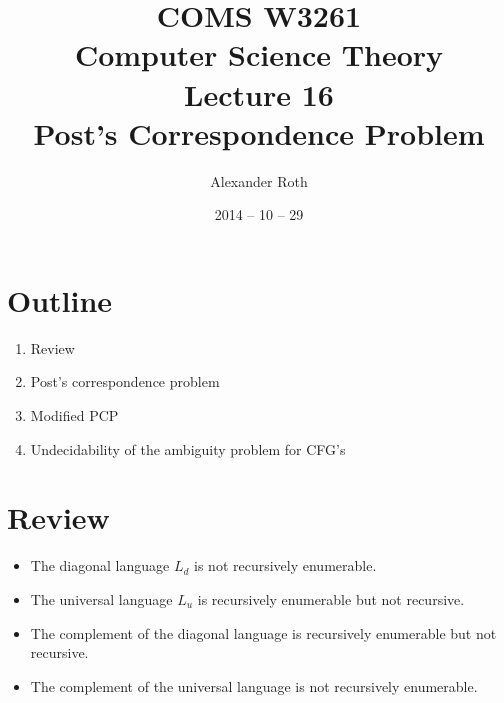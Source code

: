 \documentclass[]{article}
\begin{document}
\newcommand*{\xml}[1]{\texttt{<#1>}}
\theoremstyle{definition}
\newtheorem{thm}{Theorem}
\title{COMS W3261 \\ Computer Science Theory \\ Lecture 16 \\ Post's
Correspondence Problem}
\author{Alexander Roth}
\date{2014 -- 10 -- 29}
\maketitle

\section*{Outline}
\begin{enumerate}
\item Review
\item Post's correspondence problem
\item Modified PCP
\item Undecidability of the ambiguity problem for CFG's
\end{enumerate}

\section{Review}
\begin{itemize}
\item The diagonal language $L_d$ is not recursively enumerable.
\item The universal language $L_u$ is recursively enumerable but not recursive.
\item The complement of the diagonal language is recursively enumerable but not
recursive.
\item The complement of the universal language is not recursively enumerable.
\end{itemize}
\end{document}
